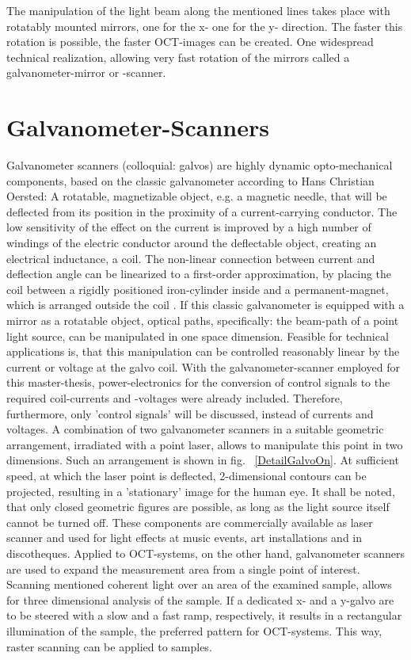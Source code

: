 The manipulation of the light beam along the mentioned lines takes place with rotatably mounted mirrors, one for the x- one for the y- direction. The faster this rotation is possible, the faster OCT-images can be created. One widespread technical realization, allowing very fast rotation of the mirrors called a galvanometer-mirror or -scanner.

\section{Galvanometer-Scanners}
Galvanometer scanners (colloquial: galvos) are highly dynamic opto-mechanical components, based on the classic galvanometer according to Hans Christian Oersted: A rotatable, magnetizable object, e.g. a magnetic needle, that will be deflected from its position in the proximity of a current-carrying conductor. The low sensitivity of the effect on the current is improved by a high number of windings of the electric conductor around the deflectable object, creating an electrical inductance, a coil. The non-linear connection between current and deflection angle can be linearized to a first-order approximation, by placing the coil between a rigidly positioned iron-cylinder inside and a permanent-magnet, which is arranged outside the coil \cite{keithleyHistory}. 
If this classic galvanometer is equipped with a mirror as a rotatable object, optical paths, specifically: the beam-path of a point light source, can be manipulated in one space dimension. Feasible for technical applications is, that this manipulation can be controlled reasonably linear by the current or voltage at the galvo coil. With the galvanometer-scanner employed for this master-thesis, power-electronics for the conversion of control signals to the required coil-currents and -voltages were already included. Therefore, furthermore, only 'control signals' will be discussed, instead of currents and voltages. A combination of two galvanometer scanners in a suitable geometric arrangement, irradiated with a point laser, allows to manipulate this point in two dimensions. Such an arrangement is shown in fig. ~\ref{DetailGalvoOn}. At sufficient speed, at which the laser point is deflected, 2-dimensional contours can be projected, resulting in a 'stationary' image for the human eye. It shall be noted, that only closed geometric figures are possible, as long as the light source itself cannot be turned off. These components are commercially available as laser scanner and used for light effects at music events, art installations and in discotheques. Applied to OCT-systems, on the other hand, galvanometer scanners are used to expand the measurement area from a single point of interest. Scanning mentioned coherent light over an area of the examined sample, allows for three dimensional analysis of the sample. If a dedicated x- and a y-galvo are to be steered with a slow and a fast ramp, respectively, it results in a rectangular illumination of the sample, the preferred pattern for OCT-systems. This way, raster scanning can be applied to samples.

